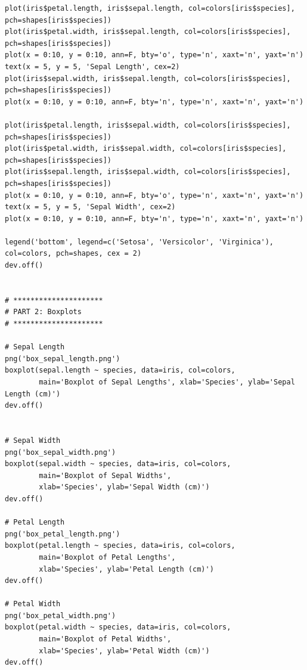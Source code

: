 \documentclass{article}
\begin{document}
\begin{lstlisting}[style=R]
plot(iris$petal.length, iris$sepal.length, col=colors[iris$species], pch=shapes[iris$species])
plot(iris$petal.width, iris$sepal.length, col=colors[iris$species], pch=shapes[iris$species])
plot(x = 0:10, y = 0:10, ann=F, bty='o', type='n', xaxt='n', yaxt='n')
text(x = 5, y = 5, 'Sepal Length', cex=2)
plot(iris$sepal.width, iris$sepal.length, col=colors[iris$species], pch=shapes[iris$species])
plot(x = 0:10, y = 0:10, ann=F, bty='n', type='n', xaxt='n', yaxt='n')

plot(iris$petal.length, iris$sepal.width, col=colors[iris$species], pch=shapes[iris$species])
plot(iris$petal.width, iris$sepal.width, col=colors[iris$species], pch=shapes[iris$species])
plot(iris$sepal.length, iris$sepal.width, col=colors[iris$species], pch=shapes[iris$species])
plot(x = 0:10, y = 0:10, ann=F, bty='o', type='n', xaxt='n', yaxt='n')
text(x = 5, y = 5, 'Sepal Width', cex=2)
plot(x = 0:10, y = 0:10, ann=F, bty='n', type='n', xaxt='n', yaxt='n')

legend('bottom', legend=c('Setosa', 'Versicolor', 'Virginica'), col=colors, pch=shapes, cex = 2)
dev.off()


# *********************
# PART 2: Boxplots
# *********************

# Sepal Length
png('box_sepal_length.png')
boxplot(sepal.length ~ species, data=iris, col=colors,
        main='Boxplot of Sepal Lengths', xlab='Species', ylab='Sepal Length (cm)')
dev.off()


# Sepal Width
png('box_sepal_width.png')
boxplot(sepal.width ~ species, data=iris, col=colors,
        main='Boxplot of Sepal Widths',
        xlab='Species', ylab='Sepal Width (cm)')
dev.off()

# Petal Length
png('box_petal_length.png')
boxplot(petal.length ~ species, data=iris, col=colors,
        main='Boxplot of Petal Lengths',
        xlab='Species', ylab='Petal Length (cm)')
dev.off()

# Petal Width
png('box_petal_width.png')
boxplot(petal.width ~ species, data=iris, col=colors,
        main='Boxplot of Petal Widths',
        xlab='Species', ylab='Petal Width (cm)')
dev.off()
\end{lstlisting}
\end{document}

